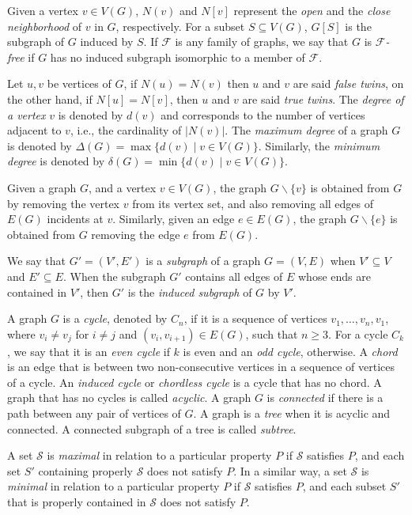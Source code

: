 Given a vertex $v\in V(G)$,  $N(v)$ and $N[v]$ represent the \emph{open} and the  \emph{close neighborhood} of $v$ in $G$, respectively. 
For a subset $S \subseteq V(G)$,  $G[S]$ is the subgraph of $G$ induced by $S$.
 If $\mathcal{F}$ is any family of graphs, we say that  $G$ is  \emph{$\mathcal{F}$-free} if $G$ has no induced subgraph isomorphic to a member of $\mathcal{F}$.


Let $u, v$  be vertices of $G$, if $N(u) = N(v)$ then $u$ and $v$ are said \emph{false twins}, on the other hand, if $N[u] = N[v]$, then $u$ and $v$ are said \emph{true twins}. The \emph{degree of a  vertex} $v$ is denoted  by $d(v)$ and corresponds to the number of vertices adjacent to $v$, i.e., the cardinality of $|N(v)|$. The \emph{maximum degree} of a graph $G$ is denoted by $\Delta(G) = \max\{d(v) \mid v \in V(G)\}$. Similarly, the  \emph{minimum degree} is denoted by  $\delta(G) = \min \{d(v) \mid v \in V(G)\}$.

Given a graph $G$, and a vertex $v \in V(G)$, the graph $G\backslash \{v\}$ is obtained from $G$ by removing the vertex $v$ from its vertex set, and also removing all edges of $E(G)$ incidents at $v$. Similarly, given an edge $e \in E(G)$, the graph $G\backslash \{e\}$ is obtained from $G$ removing the edge $e$ from $E(G)$.

We say that $G'=(V',E')$ is a \emph{subgraph} of a graph $G=(V,E)$ when $V'\subseteq V$ and $E'\subseteq E$. When the subgraph $G'$ contains all edges of $E$ whose ends are contained in $V'$, then  $G'$ is the \emph{induced subgraph} of $G$ by $V'$.  

A graph  $G$ is a \emph{cycle}, denoted by $C_n$, if it is a sequence of vertices   $v_1, \dots, v_n, v_1$, where $v_i \neq v_j$ for $i\neq j$ and $(v_i, v_{i+1})\in E(G)$,  such that $n\geq 3$. For a cycle $C_k$, we say that it is an
\emph{even cycle} if $k$ is even and an \emph{odd cycle}, otherwise. A \emph{chord} is an edge that is between two non-consecutive vertices in a sequence of vertices of a cycle. An \emph{induced cycle}  or \emph{chordless cycle} is a cycle that has no chord. A graph that has no cycles is called \emph{acyclic}. A  graph $ G $ is \emph{connected} if there is a path between any pair of  vertices of $ G $. A graph is a \emph{tree} when it is acyclic and connected. A connected subgraph of a tree is called \emph{subtree}.

A set $\mathcal{S}$ is \emph{maximal} in relation to a particular property $P$ if $\mathcal{S}$ satisfies $P$, and each set $S'$ containing properly $\mathcal{S}$ does not satisfy $P$. In a similar way, a set $\mathcal{S}$ is \emph{minimal} in relation to a particular property $P$ if $\mathcal{S}$ satisfies $P$, and each subset  $S'$ that is properly contained in $\mathcal{S}$ does not satisfy $P$.

